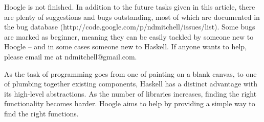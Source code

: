 \documentclass{tmr}
\begin{document}
Hoogle is not finished. In addition to the future tasks given in this article, there are plenty of suggestions and bugs outstanding, most of which are documented in the bug database (\textsf{http://code.google.com/p/ndmitchell/issues/list}). Some bugs are marked as beginner, meaning they can be easily tackled by someone new to Hoogle -- and in some cases someone new to Haskell. If anyone wants to help, please email me at \textsf{ndmitchell@gmail.com}.

As the task of programming goes from one of painting on a blank canvas, to one of plumbing together existing components, Haskell has a distinct advantage with its high-level abstractions. As the number of libraries increases, finding the right functionality becomes harder. Hoogle aims to help by providing a simple way to find the right functions.



\end{document}
